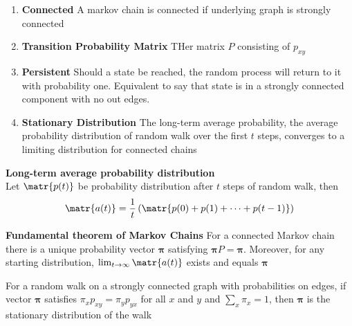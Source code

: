 \documentclass[11pt]{article}
\begin{document}
\begin{defn*}
\begin{enumerate}
\begin{enumerate}
            \item \textbf{Connected} A markov chain is connected if underlying graph is strongly connected 
            \item \textbf{Transition Probability Matrix} THer matrix $P$ consisting of $p_{xy}$
            \item \textbf{Persistent} Should a state be reached, the random process will return to it with probability one. Equivalent to say that state is in a strongly connected component with no out edges.
            \item \textbf{Stationary Distribution} The long-term average probability, the average probability distribution of random walk over the first $t$ steps, converges to a limiting distribution for connected chains
        \end{enumerate}
    \end{enumerate}
\end{defn*}




\begin{defn*}
    \textbf{Long-term average probability distribution} \\
    
    Let $\matr{p(t)}$ be probability distribution after $t$ steps of random walk, then 
    \[
        \matr{a(t)} = \frac{1}{t}\left( \matr{p(0) + p(1) + \cdots + p(t-1)} \right)
    \]
\end{defn*}

\newcommand{\sdist}{\boldsymbol{\pi}}

\begin{theorem*}
    \textbf{Fundamental theorem of Markov Chains} For a connected Markov chain there is a unique probability vector $\sdist$ satisfying $\sdist P = \sdist$. Moreover, for any starting distribution, $\lim_{t\to\infty} \matr{a(t)}$ exists and equals $\sdist$
\end{theorem*}

\begin{lemma*}
    For a random walk on a strongly connected graph with probabilities on edges, if vector $\sdist$ satisfies $\pi_x p_{xy} = \pi_y p_{yx}$ for all $x$ and $y$ and $\textstyle \sum_x \pi_x = 1$, then $\sdist$ is the stationary distribution of the walk
\end{lemma*}


\end{document}

